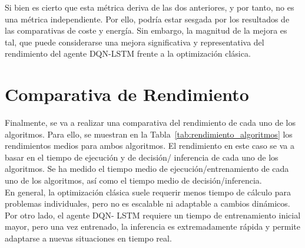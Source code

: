 Si bien es cierto que esta métrica deriva de las dos anteriores, y por tanto, no es una métrica
independiente. Por ello, podría estar sesgada por los resultados de las comparativas de coste y 
energía. Sin embargo, la magnitud de la mejora es tal, que puede considerarse una mejora 
significativa y representativa del rendimiento del agente DQN-LSTM frente a la optimización 
clásica.

\section{Comparativa de Rendimiento}
Finalmente, se va a realizar una comparativa del rendimiento de cada uno de los algoritmos.
Para ello, se muestran en la Tabla~\ref{tab:rendimiento_algoritmos} los rendimientos medios para 
ambos algoritmos. El rendimiento en este caso se va a basar en el tiempo de ejecución y de decisión/
inferencia de cada uno de los algoritmos. Se ha medido el tiempo medio de ejecución/entrenamiento de
cada uno de los algoritmos, así como el tiempo medio de decisión/inferencia.\\

En general, la optimización clásica suele requerir menos tiempo de cálculo para problemas 
individuales, pero no es escalable ni adaptable a cambios dinámicos. Por otro lado, el agente DQN-
LSTM requiere un tiempo de entrenamiento inicial mayor, pero una vez entrenado, la inferencia es 
extremadamente rápida y permite adaptarse a nuevas situaciones en tiempo real.

